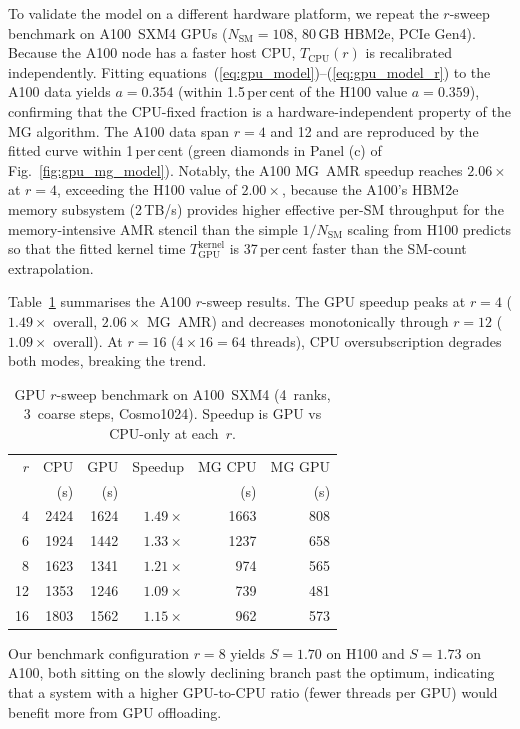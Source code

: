 \documentclass[fleqn,usenatbib]{mnras}
\begin{document}
To validate the model on a different hardware platform, we repeat
the $r$-sweep benchmark on A100~SXM4 GPUs ($N_{\mathrm{SM}} = 108$,
80\,GB HBM2e, PCIe Gen4).  Because the A100 node has a faster host CPU, 
$T_{\mathrm{CPU}}(r)$ is recalibrated independently.  Fitting
equations~(\ref{eq:gpu_model})--(\ref{eq:gpu_model_r}) to the A100
data yields $a = 0.354$ (within 1.5\,per\,cent of the H100 value
$a = 0.359$), confirming that the CPU-fixed fraction is a
hardware-independent property of the MG algorithm.  The A100 data
span $r = 4$ and 12 and are reproduced by the fitted curve within
1\,per\,cent (green diamonds in Panel (c) of Fig.~\ref{fig:gpu_mg_model}).
Notably, the A100 MG~AMR speedup reaches $2.06\times$ at $r = 4$,
exceeding the H100 value of $2.00\times$, because the A100's
HBM2e memory subsystem (2\,TB/s) provides higher effective per-SM
throughput for the memory-intensive AMR stencil than the simple
$1/N_{\mathrm{SM}}$ scaling from H100 predicts so that the fitted kernel
time $T_{\mathrm{GPU}}^{\mathrm{kernel}}$ is 37\,per\,cent faster
than the SM-count extrapolation.

Table~\ref{tab:a100_rsweep} summarises the A100 $r$-sweep results.
The GPU speedup peaks at $r = 4$ ($1.49\times$ overall, $2.06\times$
MG~AMR) and decreases monotonically through $r = 12$ ($1.09\times$
overall).  At $r = 16$ ($4 \times 16 = 64$ threads), CPU
oversubscription degrades both modes, breaking the trend.

\begin{table}
\centering
\caption{GPU $r$-sweep benchmark on A100~SXM4 (4~ranks, 3~coarse
steps, Cosmo1024).  Speedup is GPU vs CPU-only at each~$r$.}
\label{tab:a100_rsweep}
\footnotesize
\begin{tabular}{@{}rrrrrr@{}}
\toprule
$r$ & CPU & GPU & Speedup & MG CPU & MG GPU \\
    & (s) & (s) &         & (s)    & (s)    \\
\midrule
 4 & 2424 & 1624 & $1.49\times$ & 1663 &  808 \\
 6 & 1924 & 1442 & $1.33\times$ & 1237 &  658 \\
 8 & 1623 & 1341 & $1.21\times$ &  974 &  565 \\
12 & 1353 & 1246 & $1.09\times$ &  739 &  481 \\
16 & 1803 & 1562 & $1.15\times$ &  962 &  573 \\
\bottomrule
\end{tabular}
\end{table}

Our benchmark configuration $r = 8$ yields $S = 1.70$ on H100 and
$S = 1.73$ on A100, both sitting on the slowly declining branch past
the optimum, indicating that a system with a higher GPU-to-CPU ratio
(fewer threads per GPU) would benefit more from GPU offloading.
\end{document}
